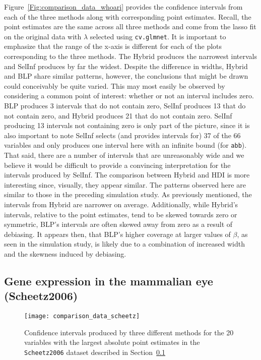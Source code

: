 Figure~\ref{Fig:comparison_data_whoari} provides the confidence intervals from each of the three methods along with corresponding point estimates. Recall, the point estimates are the same across all three methods and come from the lasso fit on the original data with $\lambda$ selected using \texttt{cv.glmnet}. It is important to emphasize that the range of the x-axis is different for each of the plots corresponding to the three methods. The Hybrid produces the narrowest intervals and SelInf produces by far the widest. Despite the difference in widths, Hybrid and BLP share similar patterns, however, the conclusions that might be drawn could conceivably be quite varied. This may most easily be observed by considering a common point of interest: whether or not an interval includes zero. BLP produces 3 intervals that do not contain zero, SelInf produces 13 that do not contain zero, and Hybrid produces 21 that do not contain zero. SelInf producing 13 intervals not containing zero is only part of the picture, since it is also important to note SelInf selects (and provides intervals for) 37 of the 66 variables and only produces one interval here with an infinite bound (for \texttt{abb}). That said, there are a number of intervals that are unreasonably wide and we believe it would be difficult to provide a convincing interpretation for the intervals produced by SelInf. The comparison between Hybrid and HDI is more interesting since, visually, they appear similar. The patterns observed here are similar to those in the preceding simulation study. As previously mentioned, the intervals from Hybrid are narrower on average. Additionally, while Hybrid's intervals, relative to the point estimates, tend to be skewed towards zero or symmetric, BLP's intervals are often skewed away from zero as a result of debiasing. It appears then, that BLP's higher coverage at larger values of $\beta$, as seen in the simulation study, is likely due to a combination of increased width and the skewness induced by debiasing.  

\subsection{Gene expression in the mammalian eye (Scheetz2006)}\label{Sec:Scheetz2006}

\begin{figure}[hbtp]
  \begin{center}
  \texttt{[image: comparison\_data\_scheetz]}
  \caption{\label{Fig:comparison_data_scheetz} Confidence intervals produced by three different methods for the 20 variables with the largest absolute point estimates in the \texttt{Scheetz2006} dataset described in Section~\ref{Sec:Scheetz2006}}
  \end{center}
\end{figure}


